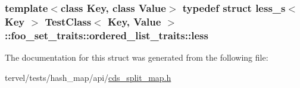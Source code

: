 \subsubsection[{less}]{\setlength{\rightskip}{0pt plus 5cm}template$<$class Key, class Value$>$ typedef struct {\bf less\+\_\+s}$<$ Key $>$ {\bf Test\+Class}$<$ Key, {\bf Value} $>$\+::{\bf foo\+\_\+set\+\_\+traits\+::ordered\+\_\+list\+\_\+traits\+::less}}\label{struct_test_class_1_1foo__set__traits_1_1ordered__list__traits_ac8741038df1d94768fbc5f5411320a1a}


The documentation for this struct was generated from the following file\+:\begin{DoxyCompactItemize}
\item 
tervel/tests/hash\+\_\+map/api/\hyperlink{cds__split__map_8h}{cds\+\_\+split\+\_\+map.\+h}\end{DoxyCompactItemize}
